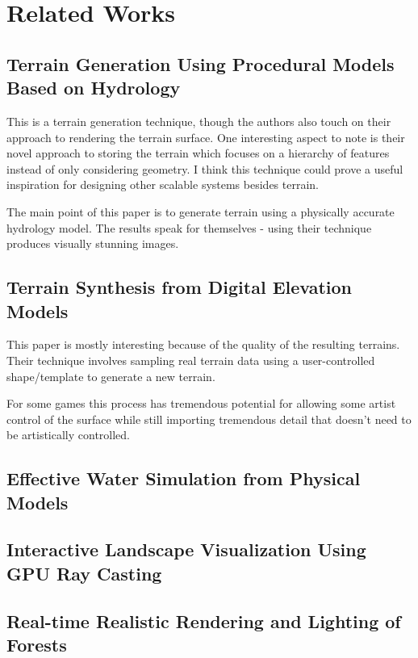 
\chapter{Related Works} \label{rworks}

\section{Terrain Generation Using Procedural Models Based on Hydrology}

This is a terrain generation technique, though the authors also touch on their approach to rendering the terrain surface.
One interesting aspect to note is their novel approach to storing the terrain which focuses on a hierarchy of features instead of only considering geometry.
I think this technique could prove a useful inspiration for designing other scalable systems besides terrain.

The main point of this paper is to generate terrain using a physically accurate hydrology model.
The results speak for themselves - using their technique produces visually stunning images.


\section{Terrain Synthesis from Digital Elevation Models}

This paper is mostly interesting because of the quality of the resulting terrains.
Their technique involves sampling real terrain data using a user-controlled shape/template to generate a new terrain.

For some games this process has tremendous potential for allowing some artist control of the surface while still importing tremendous detail that doesn't need to be artistically controlled.


\section{Effective Water Simulation from Physical Models}


\section{Interactive Landscape Visualization Using GPU Ray Casting}


\section{Real-time Realistic Rendering and Lighting of Forests}



